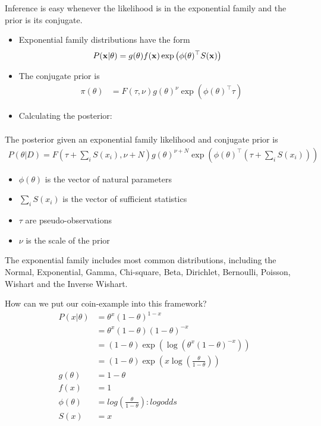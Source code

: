 Inference is easy whenever the likelihood is in the exponential family and the prior is its conjugate.
\begin{itemize}
\item Exponential family distributions  have the form 
\begin{align}
P({\mathbf{x}}|\theta)&= g(\theta) f({\mathbf{x}}) \exp\left(\phi(\theta)^\top S({\mathbf{x}})\right)
\end{align}

\item The conjugate prior is
\begin{align}
\pi(\theta)&= F(\tau,\nu) g(\theta)^\nu \exp(\phi(\theta)^\top \tau)
\end{align}
\item Calculating the posterior:
\begin{align}
 [\mbox{on board}]
\end{align}
\end{itemize}

The posterior given an exponential family likelihood and conjugate prior is 
\begin{align}
P(\theta|D)= F(\tau+ \sum_i S(x_i), \nu+N) g(\theta)^{\nu+N} \exp\left(\phi(\theta)^\top(\tau +\sum_i S(x_i)    )\right)
\end{align}

\begin{itemize}
\item $\phi(\theta)$ is the vector of {natural parameters}
\item $\sum_i S(x_i)$ is the vector of {sufficient statistics}
\item $\tau$ are {pseudo-observations}
\item $\nu$ is the scale of the prior\\
\end{itemize}

The exponential family includes most common distributions, including the Normal, Exponential, Gamma, Chi-square, Beta, Dirichlet, Bernoulli, Poisson, Wishart and the Inverse Wishart.

\begin{bbbox}{How can we put our coin-example into this framework?}
\begin{align*}
	P(x | \theta) &= \theta^x (1-\theta)^{1-x} \\
	              &= \theta^x (1-\theta)(1-\theta)^{-x} \\
	              &= (1-\theta) \exp\left(\log\left(\theta^x (1-\theta)^{-x}\right)\right) \\
	              &= (1-\theta) \exp\left(x \log\left(\frac{\theta}{1-\theta}\right)\right) \\
        g(\theta) &= 1 - \theta \\
             f(x) &= 1 \\
     \phi(\theta) &= log\left(\frac{\theta}{1 - \theta}\right) : log odds \\
             S(x) &= x
\end{align*}
\end{bbbox}
